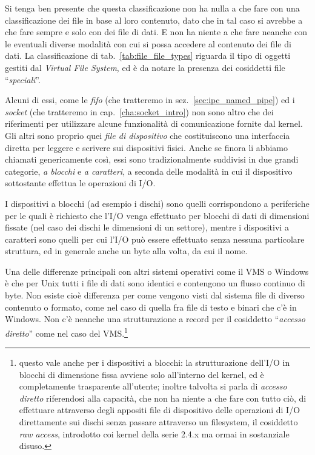 Si tenga ben presente che questa classificazione non ha nulla a che fare con
una classificazione dei file in base al loro contenuto, dato che in tal caso
si avrebbe a che fare sempre e solo con dei file di dati. E non ha niente a
che fare neanche con le eventuali diverse modalità con cui si possa accedere
al contenuto dei file di dati.  La classificazione di
tab.~\ref{tab:file_file_types} riguarda il tipo di oggetti gestiti dal
\textit{Virtual File System}, ed è da notare la presenza dei cosiddetti file
``\textsl{speciali}''.

Alcuni di essi, come le \textit{fifo} (che tratteremo in
sez.~\ref{sec:ipc_named_pipe}) ed i \textit{socket} (che tratteremo in
cap.~\ref{cha:socket_intro}) non sono altro che dei riferimenti per utilizzare
alcune funzionalità di comunicazione fornite dal kernel. Gli altri sono
proprio quei \textsl{file di dispositivo} che costituiscono una interfaccia
diretta per leggere e scrivere sui dispositivi fisici. Anche se finora li
abbiamo chiamati genericamente così, essi sono tradizionalmente suddivisi in
due grandi categorie, \textsl{a blocchi} e \textsl{a caratteri}, a seconda
delle modalità in cui il dispositivo sottostante effettua le operazioni di
I/O.

I dispositivi a blocchi (ad esempio i dischi) sono quelli corrispondono a
periferiche per le quali è richiesto che l'I/O venga effettuato per blocchi di
dati di dimensioni fissate (nel caso dei dischi le dimensioni di un settore),
mentre i dispositivi a caratteri sono quelli per cui l'I/O può essere
effettuato senza nessuna particolare struttura, ed in generale anche un byte
alla volta, da cui il nome.

Una delle differenze principali con altri sistemi operativi come il VMS o
Windows è che per Unix tutti i file di dati sono identici e contengono un
flusso continuo di byte. Non esiste cioè differenza per come vengono visti dal
sistema file di diverso contenuto o formato, come nel caso di quella fra file
di testo e binari che c'è in Windows. Non c'è neanche una strutturazione a
record per il cosiddetto ``\textsl{accesso diretto}'' come nel caso del
VMS.\footnote{questo vale anche per i dispositivi a blocchi: la strutturazione
  dell'I/O in blocchi di dimensione fissa avviene solo all'interno del kernel,
  ed è completamente trasparente all'utente; inoltre talvolta si parla di
  \textsl{accesso diretto} riferendosi alla capacità, che non ha niente a che
  fare con tutto ciò, di effettuare attraverso degli appositi file di
  dispositivo delle operazioni di I/O direttamente sui dischi senza passare
  attraverso un filesystem, il cosiddetto \textit{raw access}, introdotto coi
  kernel della serie 2.4.x ma ormai in sostanziale disuso.}

